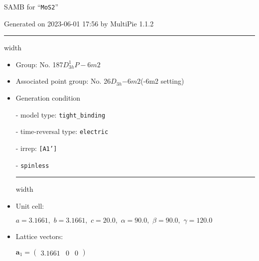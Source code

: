 \documentclass[fleqn,10pt,landscape]{article}
\begin{document}
\setcounter{MaxMatrixCols}{16}

\setlength{\baselineskip}{16pt}
\footnotesize
\begin{center}
\LARGE
SAMB for ``\texttt{MoS2}''
\end{center}
\begin{flushright}
Generated on 2023-06-01 17:56 by MultiPie 1.1.2
\end{flushright}
\vspace{1cm}


 \hfil \hrule height 1mm width \textwidth \hfil

\begin{itemize}
\item Group: No. 187\quad$D_{3h}^{1}$\quad$P-6m2$\quad[ hexagonal ]

\item Associated point group: No. 26\quad$D_{3h}$\quad$-6m2$\quad(-6m2 setting)\quad[ hexagonal ]

\vspace{5mm}

\item Generation condition

\quad - model type: \texttt{tight_binding}

\quad - time-reversal type: \texttt{electric}

\quad - irrep: \texttt{[A1']}

\quad - \texttt{spinless}


 \hfil \hrule height 1mm width \textwidth \hfil

\item Unit cell:

\quad $a=3.1661,\,\, b=3.1661,\,\, c=20.0,\,\, \alpha=90.0,\,\, \beta=90.0,\,\, \gamma=120.0$

\item Lattice vectors:

\quad $\bm{a}_1=\begin{pmatrix} 3.1661 & 0 & 0 \end{pmatrix}$


\end{itemize}
\end{document}
